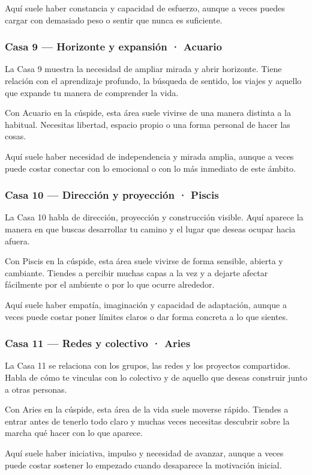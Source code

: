 \documentclass[11pt,a4paper]{article}
\begin{document}
Aquí suele haber constancia y capacidad de esfuerzo, aunque a veces puedes cargar con demasiado peso o sentir que nunca es suficiente.

\subsubsection*{Casa 9 — Horizonte y expansión · Acuario}
La Casa 9 muestra la necesidad de ampliar mirada y abrir horizonte. Tiene relación con el aprendizaje profundo, la búsqueda de sentido, los viajes y aquello que expande tu manera de comprender la vida.

Con Acuario en la cúspide, esta área suele vivirse de una manera distinta a la habitual. Necesitas libertad, espacio propio o una forma personal de hacer las cosas.

Aquí suele haber necesidad de independencia y mirada amplia, aunque a veces puede costar conectar con lo emocional o con lo más inmediato de este ámbito.

\subsubsection*{Casa 10 — Dirección y proyección · Piscis}
La Casa 10 habla de dirección, proyección y construcción visible. Aquí aparece la manera en que buscas desarrollar tu camino y el lugar que deseas ocupar hacia afuera.

Con Piscis en la cúspide, esta área suele vivirse de forma sensible, abierta y cambiante. Tiendes a percibir muchas capas a la vez y a dejarte afectar fácilmente por el ambiente o por lo que ocurre alrededor.

Aquí suele haber empatía, imaginación y capacidad de adaptación, aunque a veces puede costar poner límites claros o dar forma concreta a lo que sientes.

\subsubsection*{Casa 11 — Redes y colectivo · Aries}
La Casa 11 se relaciona con los grupos, las redes y los proyectos compartidos. Habla de cómo te vinculas con lo colectivo y de aquello que deseas construir junto a otras personas.

Con Aries en la cúspide, esta área de la vida suele moverse rápido. Tiendes a entrar antes de tenerlo todo claro y muchas veces necesitas descubrir sobre la marcha qué hacer con lo que aparece.

Aquí suele haber iniciativa, impulso y necesidad de avanzar, aunque a veces puede costar sostener lo empezado cuando desaparece la motivación inicial.
\end{document}
